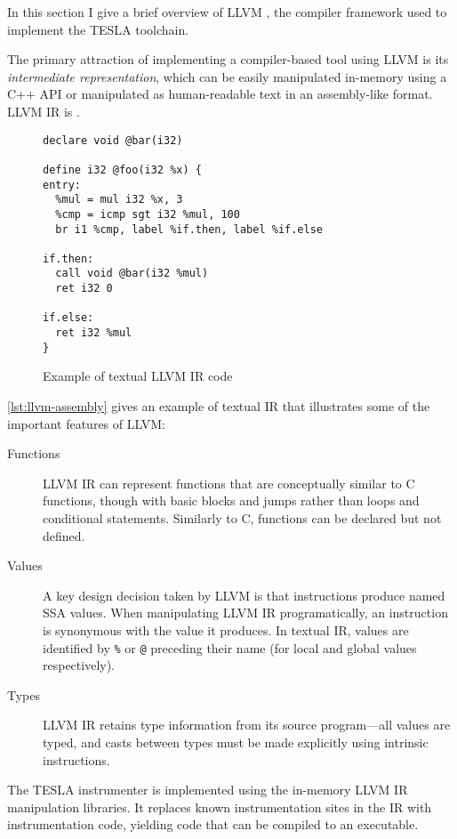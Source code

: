 In this section I give a brief overview of LLVM \cite{lattner_llvm:_2002}, the
compiler framework used to implement the TESLA toolchain.

The primary attraction of implementing a compiler-based tool using LLVM is its
\emph{intermediate representation}, which can be easily manipulated in-memory
using a C++ API or manipulated as human-readable text in an assembly-like
format. LLVM IR is .

\begin{figure}
  \begin{verbatim}
declare void @bar(i32)

define i32 @foo(i32 %x) {
entry:
  %mul = mul i32 %x, 3
  %cmp = icmp sgt i32 %mul, 100
  br i1 %cmp, label %if.then, label %if.else

if.then:
  call void @bar(i32 %mul)
  ret i32 0

if.else:
  ret i32 %mul
}
  \end{verbatim}
  \caption{Example of textual LLVM IR code}
  \label{lst:llvm-assembly}
\end{figure}

\autoref{lst:llvm-assembly} gives an example of textual IR that illustrates some
of the important features of LLVM:
\begin{description}
  \item[Functions] LLVM IR can represent functions that are conceptually similar
    to C functions, though with basic blocks and jumps rather than loops and
    conditional statements. Similarly to C, functions can be declared but not
    defined.

  \item[Values] A key design decision taken by LLVM is that instructions produce
    named SSA values. When manipulating LLVM IR programatically, an instruction
    is synonymous with the value it produces. In textual IR, values are
    identified by \texttt{\%} or \texttt{@} preceding their name (for local and
    global values respectively).

  \item[Types] LLVM IR retains type information from its source
    program---all values are typed, and casts between types must be made
    explicitly using intrinsic instructions.
\end{description}

The TESLA instrumenter is implemented using the in-memory LLVM IR manipulation
libraries. It replaces known instrumentation sites in the IR with
instrumentation code, yielding code that can be compiled to an executable.
